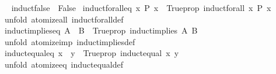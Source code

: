 \begin{isabellebody}
\ \isamarkupfalse%
\ {\isachardoublequoteopen}induct{\isacharunderscore}{\kern0pt}false\ {\isasymequiv}\ False{\isachardoublequoteclose}\isanewline
\isanewline
{}\isamarkupfalse%
\ induct{\isacharunderscore}{\kern0pt}forall{\isacharunderscore}{\kern0pt}eq{\isacharcolon}{\kern0pt}\ {\isachardoublequoteopen}{\isacharparenleft}{\kern0pt}{\isasymAnd}x{\isachardot}{\kern0pt}\ P\ x{\isacharparenright}{\kern0pt}\ {\isasymequiv}\ Trueprop\ {\isacharparenleft}{\kern0pt}induct{\isacharunderscore}{\kern0pt}forall\ {\isacharparenleft}{\kern0pt}{\isasymlambda}x{\isachardot}{\kern0pt}\ P\ x{\isacharparenright}{\kern0pt}{\isacharparenright}{\kern0pt}{\isachardoublequoteclose}\isanewline
%
\isadelimproof
\ \ %
\endisadelimproof
%
\isatagproof
{}\isamarkupfalse%
\ {\isacharparenleft}{\kern0pt}unfold\ atomize{\isacharunderscore}{\kern0pt}all\ induct{\isacharunderscore}{\kern0pt}forall{\isacharunderscore}{\kern0pt}def{\isacharparenright}{\kern0pt}%
\endisatagproof
{\isafoldproof}%
%
\isadelimproof
\isanewline
%
\endisadelimproof
\isanewline
{}\isamarkupfalse%
\ induct{\isacharunderscore}{\kern0pt}implies{\isacharunderscore}{\kern0pt}eq{\isacharcolon}{\kern0pt}\ {\isachardoublequoteopen}{\isacharparenleft}{\kern0pt}A\ {\isasymLongrightarrow}\ B{\isacharparenright}{\kern0pt}\ {\isasymequiv}\ Trueprop\ {\isacharparenleft}{\kern0pt}induct{\isacharunderscore}{\kern0pt}implies\ A\ B{\isacharparenright}{\kern0pt}{\isachardoublequoteclose}\isanewline
%
\isadelimproof
\ \ %
\endisadelimproof
%
\isatagproof
{}\isamarkupfalse%
\ {\isacharparenleft}{\kern0pt}unfold\ atomize{\isacharunderscore}{\kern0pt}imp\ induct{\isacharunderscore}{\kern0pt}implies{\isacharunderscore}{\kern0pt}def{\isacharparenright}{\kern0pt}%
\endisatagproof
{\isafoldproof}%
%
\isadelimproof
\isanewline
%
\endisadelimproof
\isanewline
{}\isamarkupfalse%
\ induct{\isacharunderscore}{\kern0pt}equal{\isacharunderscore}{\kern0pt}eq{\isacharcolon}{\kern0pt}\ {\isachardoublequoteopen}{\isacharparenleft}{\kern0pt}x\ {\isasymequiv}\ y{\isacharparenright}{\kern0pt}\ {\isasymequiv}\ Trueprop\ {\isacharparenleft}{\kern0pt}induct{\isacharunderscore}{\kern0pt}equal\ x\ y{\isacharparenright}{\kern0pt}{\isachardoublequoteclose}\isanewline
%
\isadelimproof
\ \ %
\endisadelimproof
%
\isatagproof
{}\isamarkupfalse%
\ {\isacharparenleft}{\kern0pt}unfold\ atomize{\isacharunderscore}{\kern0pt}eq\ induct{\isacharunderscore}{\kern0pt}equal{\isacharunderscore}{\kern0pt}def{\isacharparenright}{\kern0pt}%
\endisatagproof

\end{isabellebody}

